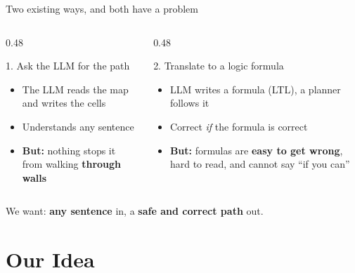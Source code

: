 \documentclass[aspectratio=169]{beamer}
\begin{document}
\begin{frame}{Two existing ways, and both have a problem}
  \begin{columns}[T]
    \begin{column}{0.48\textwidth}
      \begin{alertblock}{1. Ask the LLM for the path}
        \begin{itemize}
          \item The LLM reads the map and writes the cells
          \item Understands any sentence
          \item[] \textbf{But:} nothing stops it from walking
            \textbf{through walls}
        \end{itemize}
      \end{alertblock}
    \end{column}
    \begin{column}{0.48\textwidth}
      \begin{alertblock}{2. Translate to a logic formula}
        \begin{itemize}
          \item LLM writes a formula (LTL), a planner follows it
          \item Correct \emph{if} the formula is correct
          \item[] \textbf{But:} formulas are \textbf{easy to get wrong},
            hard to read, and cannot say ``if you can''
        \end{itemize}
      \end{alertblock}
    \end{column}
  \end{columns}
  \vspace{1em}
  \begin{center}
    We want: \textbf{any sentence} in, a \textbf{safe and correct path} out.
  \end{center}
\end{frame}

\section{Our Idea}
\end{document}
